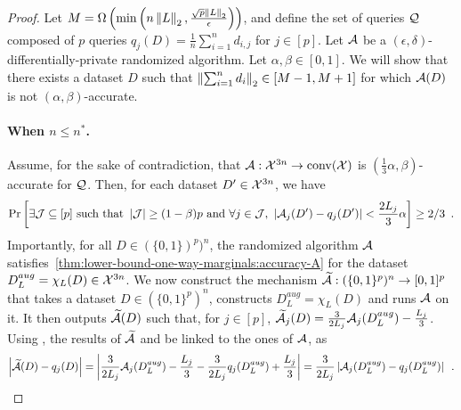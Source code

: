 \begin{proof}
  Let $M = \Omega\left(\min\left(n \left \lVert L \right \rVert_2, \frac{\sqrt{p} \left \lVert L \right \rVert_2}{\epsilon}\right)\right)$,
  and define the set of queries $\mathcal Q$ composed of $p$ queries $q_j(D) = \frac{1}{n}\sum_{i=1}^n d_{i,j}$
  for $j \in [p]$.
  Let $\mathcal A$ be a $(\epsilon, \delta)$-differentially-private randomized
  algorithm.
  Let $\alpha, \beta \in [0, 1]$.
  We will show that there exists a dataset $D$ such that
  $\left \lVert \sum_{i=1}^n d_i \right \rVert_2 \in [M-1, M+1]$ for which $\mathcal A(D)$ is not
  $(\alpha, \beta)$-accurate.



  \paragraph{When \boldmath$n \le n^*$.}
  Assume, for the sake of contradiction, that $\mathcal A : \mathcal X^{3n} \rightarrow \operatorname{conv}(\mathcal X)$
  is $(\tfrac{1}{3}\alpha, \beta)$-accurate for $\mathcal Q$.
  Then, for each dataset $D' \in \mathcal X^{3n}$, we have
  \begin{align}
    \label{thm:lower-bound-one-way-marginals:accuracy-A}
    \textnormal{Pr} \left[  \exists \mathcal J \subseteq [p]~\text{such that }\left| \mathcal J \right|
      \ge (1 - \beta)p \text{ and }\forall j \in \mathcal J,~
      \left| \mathcal A_j(D') - q_j(D') \right| < \frac{2L_j}{3} \alpha  \right]
    \ge 2/3\enspace.
  \end{align}
  Importantly, for all $D \in (\{0,1\})^p)^n$, the randomized algorithm $\mathcal A$
  satisfies~\eqref{thm:lower-bound-one-way-marginals:accuracy-A} for the
  dataset $D_L^{aug} = \chi_L(D) \in \mathcal X^{3n}$.
  We now construct the mechanism $\widetilde {\mathcal A} : (\{0, 1\}^p)^n \rightarrow [0, 1]^p$
  that takes a dataset $D \in (\{0, 1\}^p)^n$, constructs $D_L^{aug} = \chi_L(D)$
  and runs $\mathcal A$ on it.
  It then outputs $\widetilde {\mathcal A}(D)$ such that, for $j \in [p]$,
  $\widetilde {\mathcal A}_j(D) = \frac{3}{2L_j} \mathcal A_j(D_L^{aug}) - \frac{L_j}{3}$.
  Using , the results of $\widetilde {\mathcal A}$ and be linked to
  the ones of $\mathcal A$, as
  \begin{align}
    \label{thm:lower-bound-one-way-marginals:rewrite-wdA}
    \left| \widetilde {\mathcal A}(D) - q_j(D) \right|
    = \left| \frac{3}{2L_j} \mathcal A_j(D_L^{aug})- \frac{L_j}{3} - \frac{3}{2L_j} q_j(D_L^{aug}) + \frac{L_j}{3} \right|
    = \frac{3}{2L_j} \left| \mathcal A_j(D_L^{aug}) - q_j(D_L^{aug}) \right|\enspace.
  \end{align}


\end{proof}
